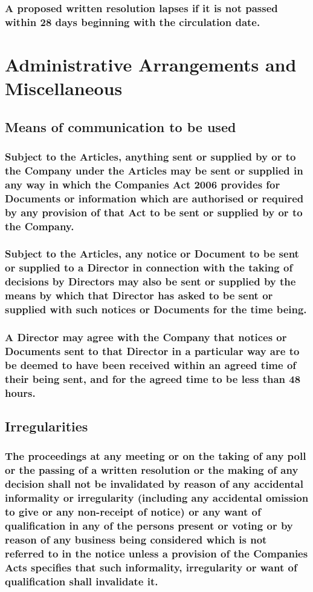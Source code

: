 \documentclass[12pt]{article}
\begin{document}
\subsubsection{A proposed written resolution lapses if it is not passed within 28 days beginning with the circulation date.}

\section*{Administrative Arrangements and Miscellaneous}
\subsection{Means of communication to be used}
\subsubsection{Subject to the Articles, anything sent or supplied by or to the Company under the Articles may be sent or supplied in any way in which the Companies Act 2006 provides for Documents or information which are authorised or required by any provision of that Act to be sent or supplied by or to the Company.}
\subsubsection{Subject to the Articles, any notice or Document to be sent or supplied to a Director in connection with the taking of decisions by Directors may also be sent or supplied by the means by which that Director has asked to be sent or supplied with such notices or Documents for the time being.}
\subsubsection{A Director may agree with the Company that notices or Documents sent to that Director in a particular way are to be deemed to have been received within an agreed time of their being sent, and for the agreed time to be less than 48 hours.}

\subsection{Irregularities}
\subsubsection{The proceedings at any meeting or on the taking of any poll or the passing of a written resolution or the making of any decision shall not be invalidated by reason of any accidental informality or irregularity (including any accidental omission to give or any non-receipt of notice) or any want of qualification in any of the persons present or voting or by reason of any business being considered which is not referred to in the notice unless a provision of the Companies Acts specifies that such informality, irregularity or want of qualification shall invalidate it.}
\end{document}
